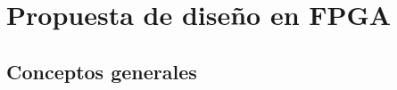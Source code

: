 \chapter{Propuesta de diseño en FPGA}\label{ch:fpga}

\section{Conceptos generales}\label{subc:fpga_congen}


